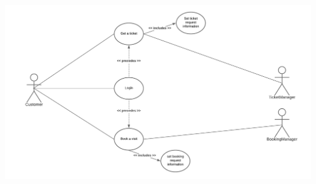\documentclass[a4paper, 12pt, oneside]{article}
\begin{document}
\begin{minipage}{\linewidth}
        \centering
           \includegraphics[height=0.33\textheight, scale=0.1, keepaspectratio]{img/book_ticket_use_diagram.png}
        \end{minipage}
\end{document}
